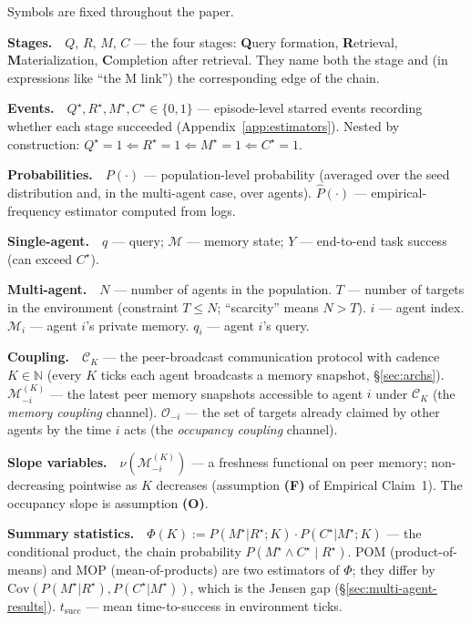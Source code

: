 \documentclass{article}
\begin{document}
Symbols are fixed throughout the paper.

\newcommand{\notentry}[1]{\par\smallskip\noindent\textbf{#1}\ \ }

\notentry{Stages.}$Q$, $R$, $M$, $C$ --- the four stages: \textbf{Q}uery formation, \textbf{R}etrieval, \textbf{M}aterialization, \textbf{C}ompletion after retrieval. They name both the stage and (in expressions like ``the M link'') the corresponding edge of the chain.

\notentry{Events.}$Q^\star, R^\star, M^\star, C^\star \in \{0, 1\}$ --- episode-level starred events recording whether each stage succeeded (Appendix~\ref{app:estimators}). Nested by construction: $Q^\star{=}1 \Leftarrow R^\star{=}1 \Leftarrow M^\star{=}1 \Leftarrow C^\star{=}1$.

\notentry{Probabilities.}$P(\cdot)$ --- population-level probability (averaged over the seed distribution and, in the multi-agent case, over agents). $\hat{P}(\cdot)$ --- empirical-frequency estimator computed from logs.

\notentry{Single-agent.}$q$ --- query; $\mathcal{M}$ --- memory state; $Y$ --- end-to-end task success (can exceed $C^\star$).

\notentry{Multi-agent.}$N$ --- number of agents in the population. $T$ --- number of targets in the environment (constraint $T \le N$; ``scarcity'' means $N > T$). $i$ --- agent index. $\mathcal{M}_i$ --- agent $i$'s private memory. $q_i$ --- agent $i$'s query.

\notentry{Coupling.}$\mathcal{C}_K$ --- the peer-broadcast communication protocol with cadence $K \in \mathbb{N}$ (every $K$ ticks each agent broadcasts a memory snapshot, \S\ref{sec:archs}). $\mathcal{M}_{-i}^{(K)}$ --- the latest peer memory snapshots accessible to agent $i$ under $\mathcal{C}_K$ (the \emph{memory coupling} channel). $\mathcal{O}_{-i}$ --- the set of targets already claimed by other agents by the time $i$ acts (the \emph{occupancy coupling} channel).

\notentry{Slope variables.}$\nu(\mathcal{M}_{-i}^{(K)})$ --- a freshness functional on peer memory; non-decreasing pointwise as $K$ decreases (assumption \textbf{(F)} of Empirical Claim~1). The occupancy slope is assumption \textbf{(O)}.

\notentry{Summary statistics.}$\Phi(K) := P(M^\star|R^\star;K)\cdot P(C^\star|M^\star;K)$ --- the conditional product, the chain probability $P(M^\star \land C^\star \mid R^\star)$. POM (product-of-means) and MOP (mean-of-products) are two estimators of $\Phi$; they differ by $\mathrm{Cov}(P(M^\star|R^\star), P(C^\star|M^\star))$, which is the Jensen gap (\S\ref{sec:multi-agent-results}). $t_{\mathrm{succ}}$ --- mean time-to-success in environment ticks.
\par\smallskip
\end{document}
